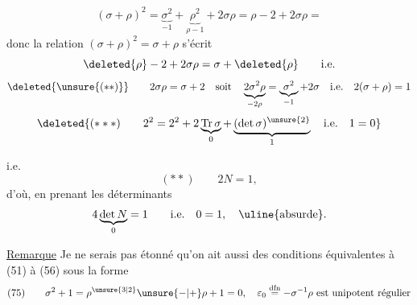 \[
(\sigma+\rho)^2=\underbrace{\sigma^2}_{-1}+\underbrace{\rho^2}_{\rho-1}+2\sigma\rho=\rho-2+2\sigma\rho=
\]
donc la relation $(\sigma+\rho)^2=\sigma+\rho$ s'écrit
\[
\deleted{\rho}-2+2\sigma\rho=\sigma+\deleted{\rho}\qquad\text{i.e.}
\]
\[
\deleted{\unsure{(**)}}\qquad
2\sigma\rho=\sigma+2\quad\text{soit}\quad
\underbrace{2\sigma^2\rho}_{-2\rho}=\underbrace{\sigma^2}_{-1}+2\sigma
\quad\text{i.e.}\quad 2(\sigma+\rho)=1
\]
\margin{$\Vert$}
\[
\deleted{(***)\qquad 2^2=2^2+2\underbrace{\operatorname{Tr}\sigma}_{0}+\underbrace{(\det\sigma)^{\unsure{2}}}_{1}\quad\text{i.e.}\quad 1=0}
\]

 i.e.
\[
(**)\qquad 2N=1,
\]
d'où, en prenant les déterminants
\[
4\underbrace{\det N}_{0}=1\qquad\text{i.e.}\quad 0=1,\quad\text{\uline{absurde}.}
\]

\uline{Remarque} Je ne serais pas étonné qu'on ait aussi des conditions équivalentes à (51) à (56) sous la forme
\[
(75)\qquad \sigma^2+1=\rho^{\unsure{3|2}}\unsure{-|+}\rho+1=0,\quad
\varepsilon_0\mathrel{\overset{\mathrm{dfn}}{=}}-\sigma^{-1}\rho\ \text{est unipotent régulier}
\]


